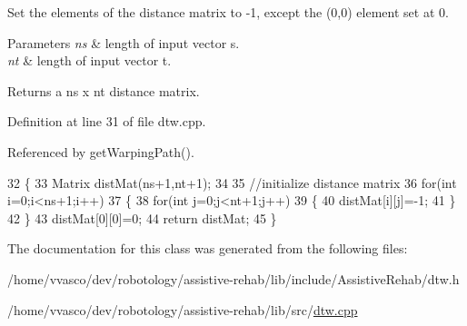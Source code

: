 Set the elements of the distance matrix to -\/1, except the (0,0) element set at 0. 


\begin{DoxyParams}{Parameters}
{\em ns} & length of input vector s. \\
\hline
{\em nt} & length of input vector t. \\
\hline
\end{DoxyParams}
\begin{DoxyReturn}{Returns}
a ns x nt distance matrix. 
\end{DoxyReturn}


Definition at line 31 of file dtw.\+cpp.



Referenced by get\+Warping\+Path().


\begin{DoxyCode}
32 \{
33     Matrix distMat(ns+1,nt+1);
34 
35     \textcolor{comment}{//initialize distance matrix}
36     \textcolor{keywordflow}{for}(\textcolor{keywordtype}{int} i=0;i<ns+1;i++)
37     \{
38         \textcolor{keywordflow}{for}(\textcolor{keywordtype}{int} j=0;j<nt+1;j++)
39         \{
40             distMat[i][j]=-1;
41         \}
42     \}
43     distMat[0][0]=0;
44     \textcolor{keywordflow}{return} distMat;
45 \}
\end{DoxyCode}


The documentation for this class was generated from the following files\+:\begin{DoxyCompactItemize}
\item 
/home/vvasco/dev/robotology/assistive-\/rehab/lib/include/\+Assistive\+Rehab/dtw.\+h\item 
/home/vvasco/dev/robotology/assistive-\/rehab/lib/src/\hyperlink{dtw_8cpp}{dtw.\+cpp}\end{DoxyCompactItemize}
